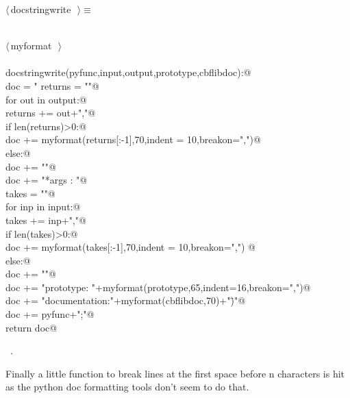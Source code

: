 \documentclass[10pt,a4paper,twoside,notitlepage]{article}
\begin{document}
\begin{flushleft} \small \label{scrap6}
$\langle\,$docstringwrite\nobreak\ {\footnotesize {}}$\,\rangle\equiv$
\vspace{-1ex}
\begin{list}{}{} \item
\mbox{}\verb@@\\
\mbox{}\verb@@\hbox{$\langle\,$myformat\nobreak\ {\footnotesize {}}$\,\rangle$}\verb@@\\
\mbox{}\verb@@\\
\mbox{}\verb@def docstringwrite(pyfunc,input,output,prototype,cbflibdoc):@\\
\mbox{}\verb@   doc = "%feature(\"autodoc\", \"\nReturns : "@\\
\mbox{}\verb@   returns = ""@\\
\mbox{}\verb@   for out in output:@\\
\mbox{}\verb@      returns += out+","@\\
\mbox{}\verb@   if len(returns)>0:@\\
\mbox{}\verb@      doc += myformat(returns[:-1],70,indent = 10,breakon=",")@\\
\mbox{}\verb@   else:@\\
\mbox{}\verb@      doc += "\n"@\\
\mbox{}\verb@   doc += "*args   : "@\\
\mbox{}\verb@   takes = ""@\\
\mbox{}\verb@   for inp in input:@\\
\mbox{}\verb@      takes += inp+","@\\
\mbox{}\verb@   if len(takes)>0:@\\
\mbox{}\verb@      doc += myformat(takes[:-1],70,indent = 10,breakon=",")   @\\
\mbox{}\verb@   else:@\\
\mbox{}\verb@      doc += "\n"@\\
\mbox{}\verb@   doc += "\nC prototype: "+myformat(prototype,65,indent=16,breakon=",")@\\
\mbox{}\verb@   doc += "\nCBFLib documentation:\n"+myformat(cbflibdoc,70)+"\")"@\\
\mbox{}\verb@   doc += pyfunc+";\n"@\\
\mbox{}\verb@   return doc@\\
\mbox{}\verb@@{\NWsep}
\end{list}
\vspace{-1ex}
\footnotesize\addtolength{\baselineskip}{-1ex}
\begin{list}{}{\setlength{\itemsep}{-\parsep}\setlength{\itemindent}{-\leftmargin}}
\item \NWtxtMacroRefIn\ .
\end{list}
\end{flushleft}
Finally a little function to break lines at the first space before n
characters is hit as the python doc formatting tools don't seem to do that.
\end{document}
